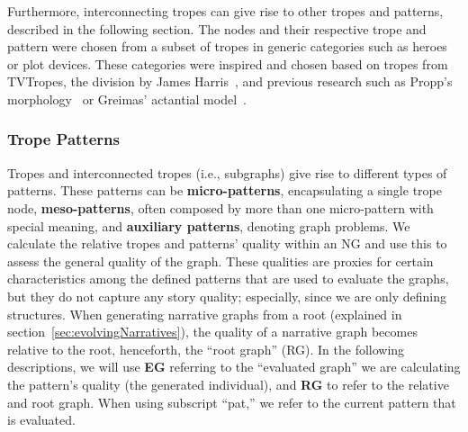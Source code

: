 Furthermore, interconnecting tropes can give rise to other tropes and patterns, described in the following section. The nodes and their respective trope and pattern were chosen from a subset of tropes in generic categories such as heroes or plot devices. These categories were inspired and chosen based on tropes from TVTropes, the division by James Harris~, and previous research such as Propp's morphology~ or Greimas' actantial model~. 

\subsubsection{Trope Patterns}


Tropes and interconnected tropes (i.e., subgraphs) give rise to different types of patterns. These patterns can be \textbf{micro-patterns}, encapsulating a single trope node, \textbf{meso-patterns}, often composed by more than one micro-pattern with special meaning, and \textbf{auxiliary patterns}, denoting graph problems. We calculate the relative tropes and patterns' quality within an NG and use this to assess the general quality of the graph. These qualities are proxies for certain characteristics among the defined patterns that are used to evaluate the graphs, but they do not capture any story quality; especially, since we are only defining structures. When generating narrative graphs from a root (explained in section~\ref{sec:evolvingNarratives}), the quality of a narrative graph becomes relative to the root, henceforth, the ``root graph'' (RG). In the following descriptions, we will use \textbf{EG} referring to the ``evaluated graph'' we are calculating the pattern's quality (the generated individual), and \textbf{RG} to refer to the relative and root graph. When using subscript ``pat,'' we refer to the current pattern that is evaluated. 


